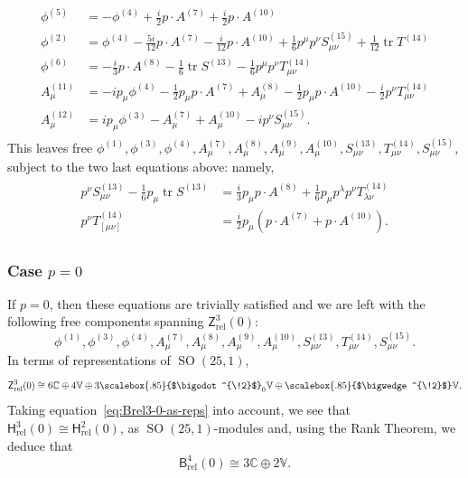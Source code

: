 \documentclass[11pt,reqno,a4paper,final]{amsart}
\newcommand\ext[1]{\scalebox{.85}{$\bigwedge^{\!#1}$}}
\newcommand\sym[1]{\scalebox{.85}{$\bigodot^{\!#1}$}}
\theoremstyle{plain}
\theoremstyle{definition}
\newcommand{\Hrel}{\mathsf{H}_{\mathrm{rel}}}
\newcommand{\Brel}{\mathsf{B}_{\mathrm{rel}}}
\newcommand{\Zrel}{\mathsf{Z}_{\mathrm{rel}}}
\newcommand{\phisup}[1]{\phi^{(#1)}}
\newcommand{\Asup}[1]{A^{(#1)}}
\newcommand{\Tsup}[1]{T^{(#1)}}
\newcommand{\Ssup}[1]{S^{(#1)}}
\newcommand{\tr}{\operatorname{tr}}
\newcommand{\VV}{\mathbb{V}}
\newcommand{\CC}{\mathbb{C}}
\newcommand{\1}{\mathbb{1}}
\newcommand{\SO}{\operatorname{SO}}
\numberwithin{equation}{section}
\begin{document}
\begin{align}
  \label{eq:Z3rel-equations-partial}
  \begin{aligned}
    \phi^{(5)} &= - \phi^{(4)} + \tfrac{i}2 p \cdot A^{(7)} + \tfrac{i}2 p \cdot A^{(10)}\\
    \phisup{2} &= \phisup{4} - \tfrac{5i}{12} p \cdot \Asup{7} - \tfrac i{12} p \cdot \Asup{10} + \tfrac 16 p^\mu p^\nu \Ssup{15}_{\mu\nu} + \tfrac1{12} \tr \Tsup{14}\\
    \phi^{(6)} &=  -\tfrac{i}3 p \cdot  A^{(8)} - \tfrac16 \tr S^{(13)} - \tfrac16 p^\mu p^\nu T^{(14)}_{\mu\nu}\\
    A^{(11)}_\mu &= - i p_\mu \phi^{(4)} - \tfrac12 p_\mu p \cdot A^{(7)} + A^{(8)}_\mu - \tfrac{1}2 p_\mu p \cdot A^{(10)} - \tfrac{i}2 p^\nu T^{(14)}_{\mu\nu}\\
    A^{(12)}_\mu &=  i p_\mu \phi^{(3)} - A^{(7)}_\mu + A^{(10)}_\mu - i p^\nu S^{(15)}_{\mu\nu}.
  \end{aligned}
\end{align}
This leaves free $\phi^{(1)},\phi^{(3)},\phi^{(4)},A^{(7)}_\mu, A^{(8)}_\mu, A^{(9)}_\mu, A^{(10)}_\mu, S^{(13)}_{\mu\nu},T^{(14)}_{\mu\nu}, S^{(15)}_{\mu\nu}$, subject to the two last equations above: namely,
\begin{align}
  \label{eq:Z3rel-remaining-equations}
  \begin{aligned}
     p^\nu S^{(13)}_{\mu\nu} - \tfrac16 p_\mu \tr S^{(13)} &=
     \tfrac{i}3 p_\mu p \cdot  A^{(8)} + \tfrac16 p_\mu p^\lambda p^\nu T^{(14)}_{\lambda\nu}\\
      p^\nu T^{(14)}_{[\mu\nu]} &=\tfrac{i}2 p_\mu (p \cdot A^{(7)} + p \cdot A^{(10)}).
  \end{aligned}
\end{align}

\subsubsection{Case $p=0$}
\label{sec:case-p=0}

If $p=0$, then these equations are trivially satisfied and we are left with the following free components spanning $\Zrel^3(0)$:
\begin{equation}
  \phi^{(1)},\phi^{(3)},\phi^{(4)},A^{(7)}_\mu, A^{(8)}_\mu, A^{(9)}_\mu, A^{(10)}_\mu, S^{(13)}_{\mu\nu},T^{(14)}_{\mu\nu}, S^{(15)}_{\mu\nu}.
\end{equation}
In terms of representations of $\SO(25,1)$,
\begin{equation}
  \label{eq:Z3rel-0-as-reps}
  \Zrel^3(0) \cong 6 \CC \oplus 4 \VV \oplus 3 \sym{2}_0 \VV \oplus \ext{2} \VV.
\end{equation}
Taking equation~\eqref{eq:Brel3-0-as-reps} into account, we see that
$\Hrel^3(0) \cong \Hrel^2(0)$, as $\SO(25,1)$-modules and, using the
Rank Theorem, we deduce that
\begin{equation}
  \label{eq:B4rel-0-as-reps}
  \Brel^4(0) \cong 3 \CC \oplus 2 \VV.
\end{equation}
\end{document}
